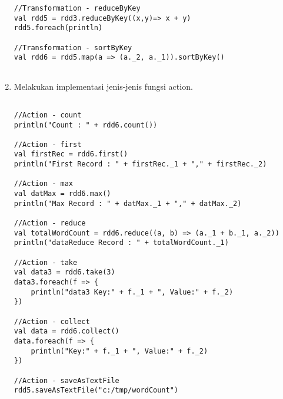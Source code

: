 \begin{enumerate}
\begin{lstlisting}[basicstyle=\ttfamily, frame=single,
	columns=fullflexible, keepspaces=true, breaklines=true, label=ls_kepatuhan_1_1_1_logo_sharif_judge, caption=Main method]
//Transformation - reduceByKey
val rdd5 = rdd3.reduceByKey((x,y)=> x + y)
rdd5.foreach(println)

//Transformation - sortByKey
val rdd6 = rdd5.map(a => (a._2, a._1)).sortByKey()
    
\end{lstlisting}

\newpage
\item Melakukan implementasi jenis-jenis fungsi action.
\begin{lstlisting}[basicstyle=\ttfamily, frame=single,
	columns=fullflexible, keepspaces=true, breaklines=true, label=ls_kepatuhan_1_1_1_logo_sharif_judge, caption=Main method]

//Action - count
println("Count : " + rdd6.count())

//Action - first
val firstRec = rdd6.first()
println("First Record : " + firstRec._1 + "," + firstRec._2)

//Action - max
val datMax = rdd6.max()
println("Max Record : " + datMax._1 + "," + datMax._2)

//Action - reduce
val totalWordCount = rdd6.reduce((a, b) => (a._1 + b._1, a._2))
println("dataReduce Record : " + totalWordCount._1)

//Action - take
val data3 = rdd6.take(3)
data3.foreach(f => {
	println("data3 Key:" + f._1 + ", Value:" + f._2)
})

//Action - collect
val data = rdd6.collect()
data.foreach(f => {
	println("Key:" + f._1 + ", Value:" + f._2)
})

//Action - saveAsTextFile
rdd5.saveAsTextFile("c:/tmp/wordCount")
	
\end{lstlisting}

\end{enumerate}


